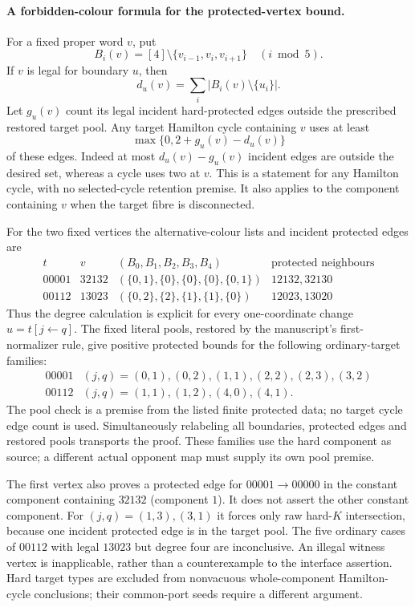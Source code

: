 \paragraph{A forbidden-colour formula for the protected-vertex bound.}
For a fixed proper word $v$, put
\[
B_i(v)=[4]\setminus\{v_{i-1},v_i,v_{i+1}\}\quad(i\bmod5).
\]
If $v$ is legal for boundary $u$, then
\[
d_u(v)=\sum_i|B_i(v)\setminus\{u_i\}|.
\]
Let $g_u(v)$ count its legal incident hard-protected edges outside
the prescribed restored target pool. Any target Hamilton cycle
containing $v$ uses at least
\[
\max\{0,2+g_u(v)-d_u(v)\}
\]
of these edges. Indeed at most $d_u(v)-g_u(v)$ incident edges are
outside the desired set, whereas a cycle uses two at $v$.
This is a statement for any Hamilton cycle, with no selected-cycle
retention premise. It also applies to the component containing $v$
when the target fibre is disconnected.

For the two fixed vertices the alternative-colour lists and incident
protected edges are
\[
\begin{array}{c|c|c|l}
t&v&(B_0,B_1,B_2,B_3,B_4)&\text{protected neighbours}\\\hline
00001&32132&(\{0,1\},\{0\},\{0\},\{0\},\{0,1\})&12132,32130\\
00112&13023&(\{0,2\},\{2\},\{1\},\{1\},\{0\})&12023,13020
\end{array}
\]
Thus the degree calculation is explicit for every one-coordinate
change $u=t[j\leftarrow q]$. The fixed literal pools, restored by
the manuscript's first-normalizer rule, give positive protected
bounds for the following ordinary-target families:
\[
\begin{array}{c|l}
00001&(j,q)=(0,1),(0,2),(1,1),(2,2),(2,3),(3,2)\\
00112&(j,q)=(1,1),(1,2),(4,0),(4,1).
\end{array}
\]
The pool check is a premise from the listed finite protected data;
no target cycle edge count is used. Simultaneously relabeling all
boundaries, protected edges and restored pools transports the proof.
These families use the hard component as source; a different actual
opponent map must supply its own pool premise.

The first vertex also proves a protected edge for
$00001\to00000$ in the constant component containing $32132$
(component $1$). It does not assert the other constant component.
For $(j,q)=(1,3),(3,1)$ it forces only raw hard-$K$ intersection,
because one incident protected edge is in the target pool. The five
ordinary cases of $00112$ with legal $13023$ but degree four are
inconclusive. An illegal witness vertex is inapplicable, rather than
a counterexample to the interface assertion. Hard target types are
excluded from nonvacuous whole-component Hamilton-cycle conclusions;
their common-port seeds require a different argument.

